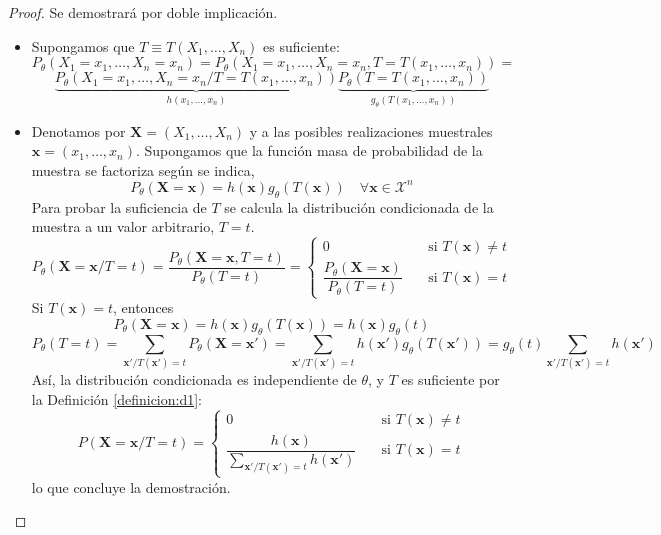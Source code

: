 \documentclass[12pt]{article}
\newcommand{\X}{\mathcal{X}}
\begin{document}
\begin{ejercicio}[2,25 puntos]
\begin{enumerate}
            \begin{proof}
                Se demostrará por doble implicación.
                \begin{itemize}
                    \item[$\Longrightarrow)$] Supongamos que $T \equiv T(X_1, \ldots, X_n)$ es suficiente:
                    $$P_\theta(X_1 = x_1, \ldots, X_n = x_n) = P_\theta(X_1 = x_1, \ldots, X_n = x_n, T = T(x_1, \ldots, x_n)) = $$
                    $$\underbrace{P_\theta(X_1 = x_1, \ldots, X_n = x_n / T = T(x_1, \ldots, x_n))}_{h(x_1, \ldots, x_n)} 
                    \underbrace{P_\theta(T = T(x_1, \ldots, x_n))}_{g_\theta(T(x_1, \ldots, x_n))}$$
                    \item[$(\Longleftarrow$] Denotamos por $\textbf{X} = (X_1, \ldots, X_n)$ y a las posibles realizaciones muestrales
                    $\textbf{x} = (x_1, \ldots, x_n)$. Supongamos que la función masa de probabilidad de la muestra se factoriza según se
                    indica, $$P_\theta(\textbf{X} = \textbf{x}) = h(\textbf{x}) g_\theta(T(\textbf{x})) \quad \forall \textbf{x} \in \X^n$$
                    Para probar la suficiencia de $T$ se calcula la distribución condicionada de la muestra a un valor arbitrario, $T=t$.
                    $$P_\theta (\textbf{X} = \textbf{x} / T = t) = \dfrac{P_\theta(\textbf{X} = \textbf{x}, T = t)}{P_\theta(T = t)} = 
                    \begin{cases}
                        0 \quad &\text{si } T(\textbf{x}) \neq t \\
                        \dfrac{P_\theta(\textbf{X} = \textbf{x})}{P_\theta(T = t)} \quad &\text{si } T(\textbf{x}) = t
                    \end{cases}$$
                    Si $T(\textbf{x}) = t$, entonces
                    $$P_\theta(\textbf{X} = \textbf{x}) = h(\textbf{x}) g_\theta(T(\textbf{x})) = h(\textbf{x}) g_\theta(t)$$
                    $$P_\theta(T = t) = \sum_{\textbf{x}' / T(\textbf{x}') = t} P_\theta(\textbf{X} = \textbf{x}') =
                    \sum_{\textbf{x}' / T(\textbf{x}') = t} h(\textbf{x}') g_\theta(T(\textbf{x}')) = 
                    g_\theta(t) \sum_{\textbf{x}' / T(\textbf{x}') = t} h(\textbf{x}')$$ 
                    Así, la distribución condicionada es independiente de $\theta$, y $T$ es suficiente por la Definición \ref{definicion:d1}:
                    $$P (\textbf{X} = \textbf{x} / T = t) = \begin{cases}
                        0 \quad &\text{si } T(\textbf{x}) \neq t \\
                        \dfrac{h(\textbf{x})}{\displaystyle\sum_{\textbf{x}' / T(\textbf{x}') = t} h(\textbf{x}')} \quad &\text{si } T(\textbf{x}) = t
                    \end{cases}$$
                    lo que concluye la demostración. \qedhere
                \end{itemize}
            \end{proof}


\end{enumerate}
\end{ejercicio}
\end{document}
